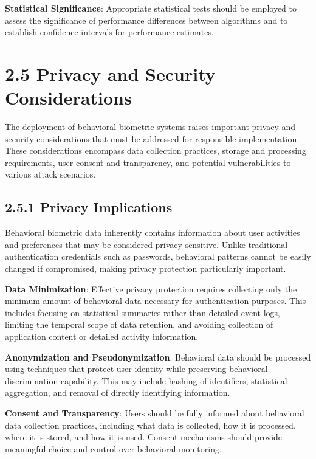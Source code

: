 \documentclass[
  12pt,
  a4paper,
]{report}
\begin{document}
\textbf{Statistical Significance}: Appropriate statistical tests should
be employed to assess the significance of performance differences
between algorithms and to establish confidence intervals for performance
estimates.

\section{2.5 Privacy and Security
Considerations}\label{privacy-and-security-considerations}

The deployment of behavioral biometric systems raises important privacy
and security considerations that must be addressed for responsible
implementation. These considerations encompass data collection
practices, storage and processing requirements, user consent and
transparency, and potential vulnerabilities to various attack scenarios.

\subsection{2.5.1 Privacy Implications}\label{privacy-implications}

Behavioral biometric data inherently contains information about user
activities and preferences that may be considered privacy-sensitive.
Unlike traditional authentication credentials such as passwords,
behavioral patterns cannot be easily changed if compromised, making
privacy protection particularly important.

\textbf{Data Minimization}: Effective privacy protection requires
collecting only the minimum amount of behavioral data necessary for
authentication purposes. This includes focusing on statistical summaries
rather than detailed event logs, limiting the temporal scope of data
retention, and avoiding collection of application content or detailed
activity information.

\textbf{Anonymization and Pseudonymization}: Behavioral data should be
processed using techniques that protect user identity while preserving
behavioral discrimination capability. This may include hashing of
identifiers, statistical aggregation, and removal of directly
identifying information.

\textbf{Consent and Transparency}: Users should be fully informed about
behavioral data collection practices, including what data is collected,
how it is processed, where it is stored, and how it is used. Consent
mechanisms should provide meaningful choice and control over behavioral
monitoring.
\end{document}
